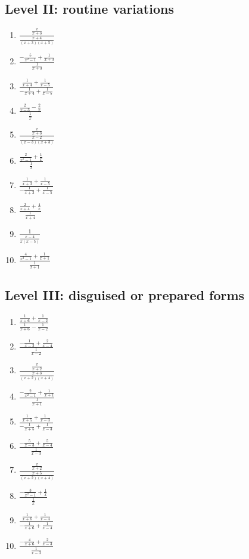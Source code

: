 \documentclass[11pt,oneside]{book}
\begin{document}
\subsection*{Level II: routine variations}
\begin{enumerate}[leftmargin=*,label=\textbf{\arabic*.},itemsep=0.65\baselineskip]
\item $\displaystyle \frac{\frac{x}{x + 3}}{\frac{x + 4}{\left(x + 3\right) \left(x + 5\right)}}$
\item $\displaystyle \frac{- \frac{5}{x^{2} - 1} + \frac{1}{x + 3}}{\frac{1}{x + 3}}$
\item $\displaystyle \frac{\frac{1}{x + 4} + \frac{1}{x - 5}}{- \frac{1}{x + 4} + \frac{1}{x - 5}}$
\item $\displaystyle \frac{\frac{2}{x - 3} - \frac{2}{x}}{\frac{1}{x}}$
\item $\displaystyle \frac{\frac{x}{x + 3}}{\frac{x - 2}{\left(x - 3\right) \left(x + 3\right)}}$
\item $\displaystyle \frac{\frac{2}{x^{2} - 1} + \frac{1}{x}}{\frac{1}{x}}$
\item $\displaystyle \frac{\frac{1}{x + 3} + \frac{1}{x - 5}}{- \frac{1}{x + 3} + \frac{1}{x - 5}}$
\item $\displaystyle \frac{\frac{2}{x + 4} + \frac{4}{x}}{\frac{1}{x + 4}}$
\item $\displaystyle \frac{1}{\frac{x - 4}{x \left(x - 5\right)}}$
\item $\displaystyle \frac{\frac{4}{x^{2} - 1} + \frac{1}{x + 1}}{\frac{1}{x + 1}}$
\end{enumerate}
\subsection*{Level III: disguised or prepared forms}
\begin{enumerate}[leftmargin=*,label=\textbf{\arabic*.},itemsep=0.65\baselineskip]
\item $\displaystyle \frac{\frac{1}{x + 6} + \frac{1}{x - 2}}{\frac{1}{x + 6} - \frac{1}{x - 2}}$
\item $\displaystyle \frac{- \frac{1}{x - 2} + \frac{2}{x - 4}}{\frac{1}{x - 2}}$
\item $\displaystyle \frac{\frac{x}{x + 2}}{\frac{x + 3}{\left(x + 2\right) \left(x + 4\right)}}$
\item $\displaystyle \frac{- \frac{2}{x^{2} - 1} + \frac{1}{x + 1}}{\frac{1}{x + 1}}$
\item $\displaystyle \frac{\frac{1}{x + 5} + \frac{1}{x - 3}}{- \frac{1}{x + 5} + \frac{1}{x - 3}}$
\item $\displaystyle \frac{- \frac{5}{x - 3} + \frac{5}{x - 4}}{\frac{1}{x - 3}}$
\item $\displaystyle \frac{\frac{x}{x + 2}}{\frac{x + 5}{\left(x + 2\right) \left(x + 4\right)}}$
\item $\displaystyle \frac{- \frac{3}{x^{2} - 1} + \frac{1}{x}}{\frac{1}{x}}$
\item $\displaystyle \frac{\frac{1}{x + 6} + \frac{1}{x - 4}}{- \frac{1}{x + 6} + \frac{1}{x - 4}}$
\item $\displaystyle \frac{- \frac{4}{x + 6} + \frac{2}{x - 3}}{\frac{1}{x - 3}}$
\end{enumerate}
\end{document}
